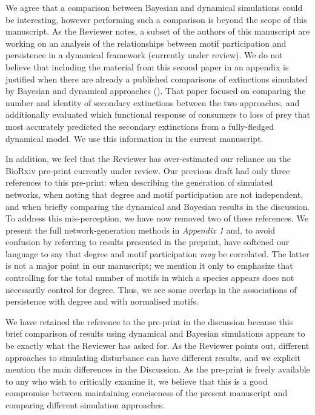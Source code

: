 \documentclass[12pt]{article}
\newcommand{\us}{\rm \setlength{\leftskip}{0.3cm} \setlength{\rightskip}{0.3cm}}
\begin{document}
        \us We agree that a comparison between Bayesian and dynamical simulations could be interesting, however performing such a comparison is beyond the scope of this manuscript. As the Reviewer notes, a subset of the authors of this manuscript are working on an analysis of the relationships between motif participation and persistence in a dynamical framework (currently under review). We do not believe that including the material from this second paper in an appendix is justified when there are already a published comparisons of extinctions simulated by Bayesian and dynamical approaches (\citealp[]{Eklof2013a}). That paper focused on comparing the number and identity of secondary extinctions between the two approaches, and additionally evaluated which functional response of consumers to loss of prey that most accurately predicted the secondary extinctions from a fully-fledged dynamical model. We use this information in the current manuscript.    
        
        
        In addition, we feel that the Reviewer has over-estimated our reliance on the BioRxiv pre-print currently under review. Our previous draft had only three references to this pre-print: when describing the generation of simulated networks, when noting that degree and motif participation are not independent, and when briefly comparing the dynamical and Bayesian results in the discussion.
        To address this mis-perception, we have now removed two of these references.
        We present the full network-generation methods in \emph{Appendix 1} and, to avoid confusion by referring to results presented in the preprint, have softened our language to say that degree and motif participation \emph{may} be correlated. 
        The latter is not a major point in our manuscript; we mention it only to emphasize that controlling for the total number of motifs in which a species appears does not necessarily control for degree. 
        Thus, we see some overlap in the associations of persistence with degree and with normalised motifs.
        
        
        We have retained the reference to the pre-print in the discussion because this brief comparison of results using dynamical and Bayesian simulations appears to be exactly what the Reviewer has asked for.
        As the Reviewer points out, different approaches to simulating disturbance can have different results, and we explicit mention the main differences in the Discussion. 
        As the pre-print is freely available to any who wish to critically examine it, we believe that this is a good compromise between maintaining conciseness of the present manuscript and comparing different simulation approaches.
        
\end{document}
